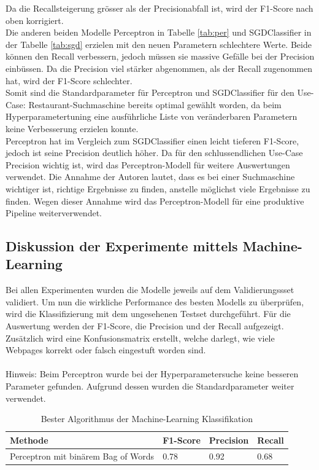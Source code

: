 Da die Recallsteigerung grösser als der Precisionabfall ist, wird der F1-Score nach oben korrigiert.\\
Die anderen beiden Modelle Perceptron in Tabelle \cref{tab:per} und SGDClassifier in der Tabelle \cref{tab:sgd} erzielen mit den neuen Parametern schlechtere Werte.
Beide können den Recall verbessern, jedoch müssen sie massive Gefälle bei der Precision einbüssen.
Da die Precision viel stärker abgenommen, als der Recall zugenommen hat, wird der F1-Score schlechter.\\
Somit sind die Standardparameter für Perceptron und SGDClassifier für den \glqq Use-Case: Restaurant-Suchmaschine\grqq{} bereits optimal gewählt worden, da beim Hyperparametertuning eine ausführliche Liste von veränderbaren Parametern keine Verbesserung erzielen konnte.\\
Perceptron hat im Vergleich zum SGDClassifier einen leicht tieferen F1-Score, jedoch ist seine Precision deutlich höher.
Da für den schlussendlichen \glqq Use-Case\grqq{} Precision wichtig ist, wird das Perceptron-Modell für weitere Auswertungen verwendet.
Die Annahme der Autoren lautet, dass es bei einer Suchmaschine wichtiger ist, richtige Ergebnisse zu finden, anstelle möglichst viele Ergebnisse zu finden.
Wegen dieser Annahme wird das Perceptron-Modell für eine produktive Pipeline weiterverwendet.
\subsection{Diskussion der Experimente mittels Machine-Learning}
Bei allen Experimenten wurden die Modelle jeweils auf dem Validierungssset validiert.
Um nun die wirkliche Performance des besten Modells zu überprüfen, wird die Klassifizierung mit dem ungesehenen Testset durchgeführt.
Für die Auswertung werden der F1-Score, die Precision und der Recall aufgezeigt.
Zusätzlich wird eine Konfusionsmatrix erstellt, welche darlegt, wie viele Webpages korrekt oder falsch eingestuft worden sind.
\\\\
Hinweis: Beim Perceptron wurde bei der Hyperparametersuche keine besseren Parameter gefunden.
Aufgrund dessen wurden die Standardparameter weiter verwendet.

\begin{table}[H]
	\caption{Bester Algorithmus der Machine-Learning Klassifikation}
	\centering
	\label{tab:bestclf}
	\begin{tabular}{|l|l|l|l|}
		\hline
		Methode & F1-Score & Precision & Recall\\
		\hline
		Perceptron mit binärem Bag of Words & 0.78 & 0.92 & 0.68 \\
		\hline
	\end{tabular}
\end{table}

